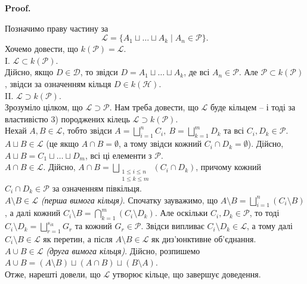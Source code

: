 \documentclass[a4paper, 10pt]{article}
\makeatletter
\theoremstyle{theoremdd}
\renewenvironment{proof}[1][Proof.\\]{\par
\pushQED{\hfill \qed}%
\normalfont \topsep6\p@\@plus6\p@\relax
\trivlist
\item\relax
{\bfseries
#1\@addpunct{.}}\hspace\labelsep\ignorespaces
}{%
\popQED\endtrivlist\@endpefalse
}
\makeatother
\begin{document}
\begin{proof}
Позначимо праву частину за \[
\mathcal{L} = \{A_1 \sqcup \dots \sqcup A_k \mid A_n \in \mathcal{P}\}.
\]
Хочемо довести, що $k(\mathcal{P}) = \mathcal{L}$.
\bigskip \\
I. $\mathcal{L} \subset k(\mathcal{P})$.\\
Дійсно, якщо $D \in \mathcal{D}$, то звідси $D = A_1 \sqcup \dots \sqcup A_k$, де всі $A_n \in \mathcal{P}$. Але $\mathcal{P} \subset k(\mathcal{P})$, звідси за означенням кільця $D \in k(\mathcal{H})$.
\bigskip \\
II. $\mathcal{L} \supset k(\mathcal{P})$.\\
Зрозуміло цілком, що $\mathcal{L} \supset \mathcal{P}$. Нам треба довести, що $\mathcal{L}$ буде кільцем -- і тоді за властивістю 3) породжених кілець $\mathcal{L} \supset k(\mathcal{P})$.\\
Нехай $A,B \in \mathcal{L}$, тобто звідси $A = \displaystyle\bigsqcup_{i=1}^n C_i,\ B = \displaystyle\bigsqcup_{k=1}^m D_k$ та всі $C_i, D_k \in \mathcal{P}$.\\
$A \sqcup B \in \mathcal{L}$ (це якщо $A \cap B = \emptyset$, а тому звідси кожний $C_i \cap D_k = \emptyset$). Дійсно, $A \sqcup B = C_1 \sqcup \dots \sqcup D_m$, всі ці елементи з $\mathcal{P}$.\\
$A \cap B \in \mathcal{L}$. Дійсно, $A \cap B = \displaystyle\bigsqcup_{\substack{1 \leq i \leq n \\ 1 \leq k \leq m}} (C_i \cap D_k)$, причому кожний $C_i \cap D_k \in \mathcal{P}$ за означенням півкільця.\\
$A \setminus B \in \mathcal{L}$ \textit{(перша вимога кільця)}. Спочатку зауважимо, що $A \setminus B = \displaystyle\bigsqcup_{i=1}^n (C_i \setminus B)$, а далі кожний $C_i \setminus B = \displaystyle\bigcap_{k=1}^m (C_i \setminus D_k)$. Але оскільки $C_i,D_k \in \mathcal{P}$, то тоді $C_i \setminus D_k = \displaystyle\bigsqcup_{r=1}^{s_{ik}} G_r$ та кожний $G_r \in \mathcal{P}$. Звідси випливає $C_i \setminus D_k \in \mathcal{L}$, а тому далі $C_i \setminus B \in \mathcal{L}$ як перетин, а після $A \setminus B \in \mathcal{L}$ як диз'юнктивне об'єднання.\\
$A \cup B \in \mathcal{L}$ \textit{(друга вимога кільця)}. Дійсно, розпишемо $A \cup B = (A \setminus B) \sqcup (A \cap B) \sqcup (B \setminus A)$.\\
Отже, нарешті довели, що $\mathcal{L}$ утворює кільце, що завершує доведення.
\end{proof}
\end{document}
